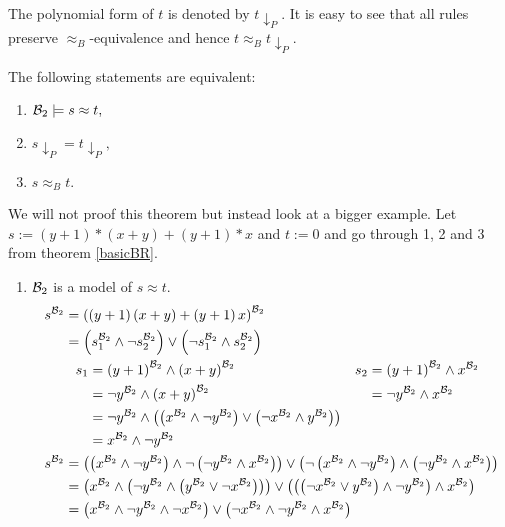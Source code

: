 	The polynomial form of $t$ is denoted by $t{\downarrow_P}$. It is easy to see that all rules preserve $\approx_B$-equivalence and hence $t\approx_Bt{\downarrow_P}$.
	\begin{theorem}\label{basicBR}
		The following statements are equivalent:
		\begin{enumerate}
			\item ${\mathcal{B}_2}\models s\approx t,$
			\item $s{\downarrow_P}=t{\downarrow_P},$
			\item $s\approx_B t.$
		\end{enumerate}
	\end{theorem}
	We will not proof this theorem but instead look at a bigger example. Let $s:=(y+1)*(x+y)+(y+1)*x$ and $t:=0$ and go through 1, 2 and 3 from theorem \ref{basicBR}.
	\begin{enumerate}
			\item ${\mathcal{B}_2}$ is a model of $s\approx t$.
			\begin{align*}
				s^\BTwo & =\left( \left( y+1\right)\left( x+y\right)+\left( y+1\right)x\right)^\BTwo       \\
				& =\left( s_1^\BTwo\wedge \neg s_2^\BTwo\right)\vee\left( \neg s_1^\BTwo\wedge s_2^\BTwo\right) \\
				&\hspace{8pt}\begin{aligned}
				s_1 & =\left( y+1\right)^\BTwo\wedge\left( x+y\right)^\BTwo & s_2 & =   \left( y+1\right)^\BTwo\wedge x^\BTwo \\
				    & =\neg y^\BTwo\wedge\left( x+y\right)^\BTwo            &     & = \neg y^\BTwo\wedge x^\BTwo              \\
				&=\neg y^\BTwo\wedge\left( \left( x^\BTwo\wedge\neg y^\BTwo\right)\vee\left( \neg x^\BTwo\wedge y^\BTwo\right)\right)\\
				& = x^\BTwo\wedge\neg y^\BTwo
				\end{aligned}\\
				s^\BTwo & =\left( \left( x^\BTwo\wedge\neg y^\BTwo\right)\wedge \neg \left( \neg y^\BTwo\wedge x^\BTwo\right)\right)\vee\left( \neg\left( x^\BTwo\wedge\neg y^\BTwo\right)\wedge \left( \neg y^\BTwo\wedge x^\BTwo\right)\right) \\
				& =\left( x^\BTwo\wedge\left( \neg y^\BTwo\wedge \left( y^\BTwo\vee\neg x^\BTwo\right)\right)\right)\vee\left( \left( \left( \neg x^\BTwo\vee y^\BTwo\right)\wedge \neg y^\BTwo\right)\wedge x^\BTwo\right)              \\
				& =\left( x^\BTwo\wedge\neg y^\BTwo\wedge \neg x^\BTwo\right)\vee\left( \neg x^\BTwo\wedge \neg y^\BTwo\wedge x^\BTwo\right)                                                                                             \\

\end{align*}
\end{enumerate}
